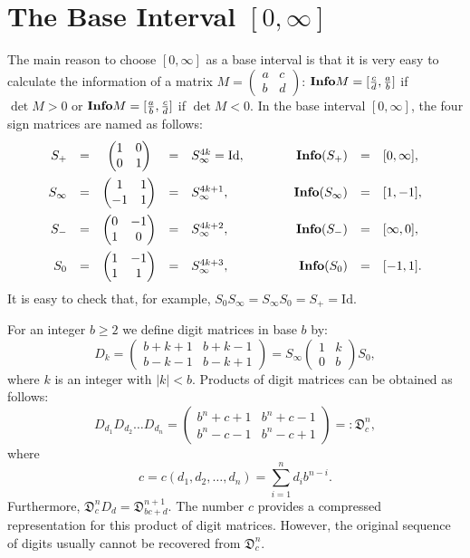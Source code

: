 \documentclass[11pt,a4paper]{article}
\begin{document}
\section{The Base Interval $[0,\infty]$}
The main reason to choose $[0,\infty]$ as a base interval is that it is
	very easy to calculate the information of a matrix $M=\begin{pmatrix}
	a&c\\b&d \end{pmatrix}$: ${\bf Info}M=[\frac{c}{d},\frac{a}{b}]$ if
	$\det M > 0$ or ${\bf Info}M=[\frac{a}{b},\frac{c}{d}]$ if $\det M < 0$.
	In the base interval $[0,\infty]$, the four sign matrices are named
	as follows:
	\[ \begin{array}{rccclcrcl}
		S_+ &=& \begin{pmatrix} 1&0 \\ 0&1 \end{pmatrix} &=&
			S_\infty^{4k} = \textrm{Id}, &\qquad&
			\textbf{Info}(S_+) &=& [0,\infty], \vspace{0.5em} \\
		S_{\infty} &=& \begin{pmatrix} 1&1 \\ -1&1 \end{pmatrix} &=&
			S_\infty^{4k+1}, &\qquad&
			\textbf{Info}(S_\infty) &=& [1,-1], \vspace{0.5em} \\
		S_- &=& \begin{pmatrix} 0&-1 \\ 1&0 \end{pmatrix} &=&
			S_\infty^{4k+2}, &\qquad&
			\textbf{Info}(S_-) &=& [\infty,0], \vspace{0.5em} \\
		S_0 &=& \begin{pmatrix} 1&-1 \\ 1&1 \end{pmatrix} &=&
			S_\infty^{4k+3}, &\qquad&
			\textbf{Info}(S_0) &=& [-1,1].
    \end{array} \]
	It is easy to check that, for example, $S_0 S_\infty =
	S_\infty S_0 = S_+ = \textrm{Id}$.

	For an integer $b \ge 2$ we define digit matrices in base $b$ by:
	\[ D_k = \begin{pmatrix} b+k+1 & b+k-1 \\ b-k-1 & b-k+1 \end{pmatrix}
		= S_\infty \begin{pmatrix} 1&k\\0&b \end{pmatrix} S_0, \]
	where $k$ is an integer with $ |k| < b$. Products of digit matrices
	can be obtained as follows:
	\[ D_{d_1} D_{d_2} \ldots D_{d_n} = \begin{pmatrix}
		b^n+c+1 & b^n+c-1 \\ b^n-c-1 & b^n-c+1 \end{pmatrix} =:
		\mathfrak{D}_c^n, \]
	where
	\[ c = c(d_1,d_2,\ldots,d_n) = \sum_{i=1}^n d_i b^{n-i}. \]
	Furthermore, $\mathfrak{D}_c^n D_d = \mathfrak{D}_{bc+d}^{n+1}$. The
	number $c$ provides a compressed representation for this product
	of digit matrices. However, the original sequence of digits usually
	cannot be recovered from $\mathfrak{D}_c^n$.
\end{document}
